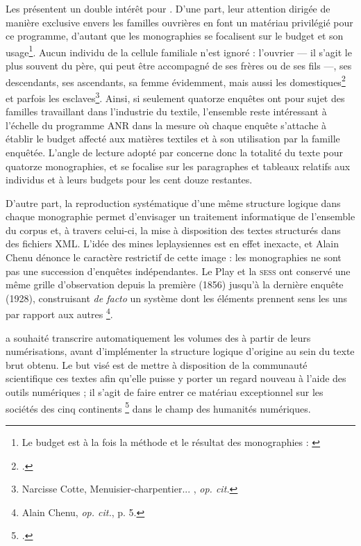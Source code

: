 Les \odm{} présentent un double intérêt pour \timeus. D'une part, leur attention dirigée de manière exclusive envers les familles ouvrières en font un matériau privilégié pour ce programme, d'autant que les monographies se focalisent sur le budget et son usage\footnote{Le budget est \og à la fois la méthode et le résultat \fg{} des monographies : \cite[p. 11]{cardoni}}. Aucun individu de la cellule familiale n'est ignoré : l'ouvrier --- il s'agit le plus souvent du père, qui peut être accompagné de ses frères ou de ses fils ---, ses descendants, ses ascendants, sa femme évidemment, mais aussi les domestiques\footcite{mono018a} et parfois les esclaves\footnote{Narcisse Cotte, \og Menuisier-charpentier... \fg{}, \textit{op. cit.}}. Ainsi, si seulement quatorze enquêtes ont pour sujet des familles travaillant dans l'industrie du textile, l'ensemble reste intéressant à l'échelle du programme ANR dans la mesure où chaque enquête s'attache à établir le budget affecté aux matières textiles et à son utilisation par la famille enquêtée. L'angle de lecture adopté par \timeus{} concerne donc la totalité du texte pour quatorze monographies, et se focalise sur les paragraphes et tableaux relatifs aux individus et à leurs budgets pour les cent douze restantes.

D'autre part, la reproduction systématique d'une même structure logique dans chaque monographie permet d'envisager un traitement informatique de l'ensemble du corpus et, à travers celui-ci, la mise à disposition des textes structurés dans des fichiers XML. L'idée des \og mines \fg{} leplaysiennes est en effet inexacte, et Alain Chenu dénonce le caractère restrictif de cette image : les monographies ne sont pas une succession d'enquêtes indépendantes. Le Play et la \textsc{sess} ont conservé une même \og grille d'observation \fg{} depuis la première (1856) jusqu'à la dernière enquête (1928), construisant \textit{de facto} un \og système dont les éléments prennent sens les uns par rapport aux autres \fg{}\footnote{Alain Chenu, \textit{op. cit.}, p. 5.}.

\timeus{} a souhaité transcrire automatiquement les volumes des \odm{} à partir de leurs numérisations, avant d'implémenter la structure logique d'origine au sein du texte brut obtenu. Le but visé est de mettre à disposition de la communauté scientifique ces textes afin qu'elle puisse y porter un regard nouveau à l'aide des outils numériques ; il s'agit de faire entrer ce \og matériau exceptionnel sur les sociétés des cinq continents \fg{}\footcite{savoye} dans le champ des humanités numériques.

